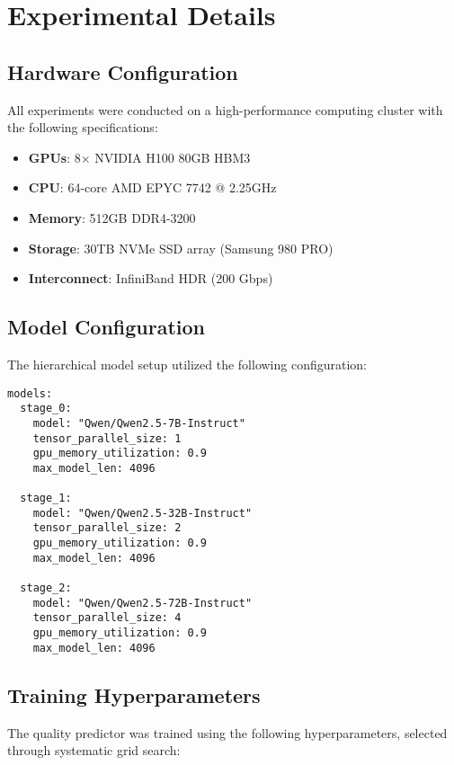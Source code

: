 \documentclass{article}
\theoremstyle{plain}
\theoremstyle{definition}
\theoremstyle{remark}
\begin{document}
\section{Experimental Details}
\label{app:experimental}

\subsection{Hardware Configuration}

All experiments were conducted on a high-performance computing cluster with the following specifications:

\begin{itemize}
\item \textbf{GPUs}: 8× NVIDIA H100 80GB HBM3
\item \textbf{CPU}: 64-core AMD EPYC 7742 @ 2.25GHz
\item \textbf{Memory}: 512GB DDR4-3200
\item \textbf{Storage}: 30TB NVMe SSD array (Samsung 980 PRO)
\item \textbf{Interconnect}: InfiniBand HDR (200 Gbps)
\end{itemize}

\subsection{Model Configuration}

The hierarchical model setup utilized the following configuration:

\begin{verbatim}
models:
  stage_0:
    model: "Qwen/Qwen2.5-7B-Instruct"
    tensor_parallel_size: 1
    gpu_memory_utilization: 0.9
    max_model_len: 4096
    
  stage_1:
    model: "Qwen/Qwen2.5-32B-Instruct" 
    tensor_parallel_size: 2
    gpu_memory_utilization: 0.9
    max_model_len: 4096
    
  stage_2:
    model: "Qwen/Qwen2.5-72B-Instruct"
    tensor_parallel_size: 4
    gpu_memory_utilization: 0.9
    max_model_len: 4096
\end{verbatim}

\subsection{Training Hyperparameters}

The quality predictor was trained using the following hyperparameters, selected through systematic grid search:
\end{document}
